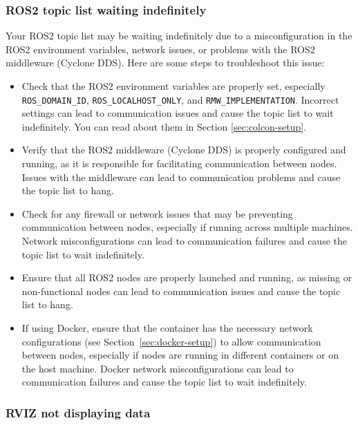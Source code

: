 \subsubsection{ROS2 topic list waiting indefinitely}
Your ROS2 topic list may be waiting indefinitely due to a misconfiguration in the ROS2 environment variables, network issues, or problems with the ROS2 middleware (Cyclone DDS). Here are some steps to troubleshoot this issue:
    \begin{itemize}
        \item Check that the ROS2 environment variables are properly set, especially \texttt{ROS\_DOMAIN\_ID}, \texttt{ROS\_LOCALHOST\_ONLY}, and \texttt{RMW\_IMPLEMENTATION}. Incorrect settings can lead to communication issues and cause the topic list to wait indefinitely. You can read about them in Section \ref{sec:colcon-setup}.
        \item Verify that the ROS2 middleware (Cyclone DDS) is properly configured and running, as it is responsible for facilitating communication between nodes. Issues with the middleware can lead to communication problems and cause the topic list to hang.
        \item Check for any firewall or network issues that may be preventing communication between nodes, especially if running across multiple machines. Network misconfigurations can lead to communication failures and cause the topic list to wait indefinitely.
        \item Ensure that all ROS2 nodes are properly launched and running, as missing or non-functional nodes can lead to communication issues and cause the topic list to hang.
        \item If using Docker, ensure that the container has the necessary network configurations (see Section~\ref{sec:docker-setup}) to allow communication between nodes, especially if nodes are running in different containers or on the host machine. Docker network misconfigurations can lead to communication failures and cause the topic list to wait indefinitely.
    \end{itemize}

\subsubsection{RVIZ not displaying data}


